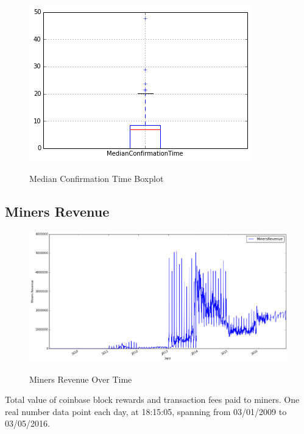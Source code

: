 \begin{figure}[bth]
  \myfloatalign
  {\includegraphics[width=1\linewidth]
    {gfx/median-confirmation-time-boxplot}}
  \caption{Median Confirmation Time Boxplot}
  \label{fig:median-confirmation-time-boxplot}
\end{figure}

\clearpage

\subsection{Miners Revenue}
\label{sec:miners-revenue}

\begin{figure}[bth]
  \myfloatalign
  {\includegraphics[width=1\linewidth]
    {gfx/miners-revenue-over-time}}
  \caption{Miners Revenue Over Time}
  \label{fig:miners-revenue-over-time}
\end{figure}

Total value of coinbase block rewards and transaction fees paid to
miners. One real number data point each day, at 18:15:05, spanning
from 03/01/2009 to 03/05/2016.

